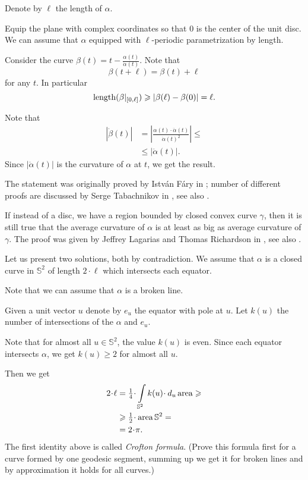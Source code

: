 Denote by $\ell$ the length of $\alpha$.

Equip the plane with complex coordinates so that $0$ is the center of the unit disc.
We can assume that $\alpha$ equipped with $\ell$-periodic parametrization by length.

Consider the curve $\beta(t)=t-\tfrac{\alpha(t)}{\dot\alpha(t)}$.
Note that 
\[\beta(t+\ell)=\beta(t)+\ell\] 
for any $t$.
In particular 
\[\operatorname{\rm length} (\beta|_{[0,\ell]}) 
\geqslant 
|\beta(\ell)-\beta(0)|
=
\ell.\]

Note that 
\begin{align*}
|\dot\beta(t)|&=|\tfrac{\alpha(t)\cdot\ddot\alpha(t)}{\dot\alpha(t)^2}|\le
\\
&\le|\ddot\alpha(t)|.
\end{align*}
Since $|\ddot\alpha(t)|$ is the curvature of $\alpha$ at $t$,
we get the result.\qeds

The statement was originally proved 
by Istv\'an F\'ary in \cite{fary};
number of different proofs are discussed by Serge Tabachnikov in \cite{tabachnikov}, see also \cite[19.5 in ][]{fuchs-tabachnikov}.

If instead of a disc, 
we have a region bounded by closed convex curve $\gamma$, 
then it is still true that the average curvature of $\alpha$ is at least as big as average curvature of $\gamma$. 
The proof was given by Jeffrey Lagarias
and Thomas Richardson in \cite{lagarias-richardson}, see also \cite{nazarov-petrov}.


Let us present two solutions, both by contradiction.
We assume that $\alpha$ is a closed curve in $\mathbb{S}^2$ of length $2\cdot\ell$ which intersects each equator.

Note that we can assume that $\alpha$ is a broken line.

Given a unit vector $u$ denote by $e_u$ the equator with pole at $u$.
Let $k(u)$ the number of intersections
of the $\alpha$ and $e_u$.

Note that for almost all $u\in \mathbb{S}^2$, the value $k(u)$ is even.
Since each equator intersects $\alpha$, we get $k(u)\ge 2$ for almost all $u$.

Then we get
\begin{align*}
2\cdot\ell&=\tfrac14\cdot\int\limits_{\mathbb{S}^2}k(u)\cdot\, d_u\area\ge 
\\
&\ge\tfrac12\cdot\area\mathbb{S}^2=
\\
&=2\cdot\pi.
\end{align*}
The first identity above is called \emph{Crofton formula}.
(Prove this formula first for a curve formed by one geodesic segment,
summing up we get it for broken lines
and by approximation it holds for all curves.)
\qeds

